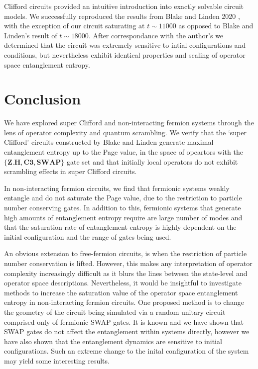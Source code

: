 \documentclass[aps]{revtex4-2}
\begin{document}
Clifford circuits provided an intuitive introduction into exactly solvable circuit models. We successfully reproduced the results from Blake and Linden 2020 \cite{Blake2020}, with the exception of our circuit saturating at $t \sim 11000$ as opposed to Blake and Linden's result of $t\sim 18000$. After correspondance with the author's we determined that the circuit was extremely sensitive to intial configurations and conditions, but nevertheless exhibit identical properties and scaling of operator space entanglement entropy.



\section{Conclusion}
We have explored super Clifford and non-interacting fermion systems through the lens of operator complexity and quantum scrambling.
We verify that the `super Clifford' circuits constructed by Blake and Linden \cite{Blake2020} generate maximal entanglement entropy up to the Page value, in the space of opeartors with the $\{\mathbf{Z.H}, \mathbf{C3}, \mathbf{SWAP}\}$ gate set and that initially local operators do not exhibit scrambling effects in super Clifford circuits. 

In non-interacting fermion circuits, we find that fermionic systems weakly entangle and do not saturate the Page value, due to the restriction to particle number conserving gates. In addition to this, fermionic systems that generate high amounts of entanglement entropy require are large number of modes and that the saturation rate of entanglement entropy is highly dependent on the initial configuration and the range of gates being used.

An obvious extension to free-fermion circuits, is when the restriction of particle number conservation is lifted. However, this makes any interpretation of operator complexity increasingly difficult as it blurs the lines between the state-level and operator space descriptions. Nevertheless, it would be insightful to investigate methods to increase the saturation value of the operator space entanglement entropy in non-interacting fermion circuits. One proposed method is to change the geometry of the circuit being simulated via a random unitary circuit comprised only of fermionic SWAP gates. It is known and we have shown that SWAP gates do not affect the entanglement within systems directly, however we have also shown that the entanglement dynamics are sensitive to initial configurations. Such an extreme change to the inital configuration of the system may yield some interesting results.
\end{document}
